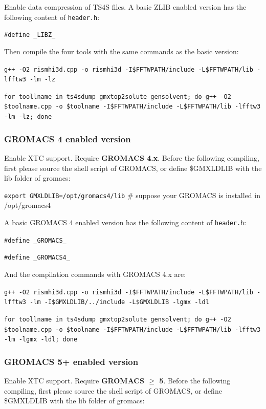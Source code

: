 \documentclass[aip,amsmath,amssymb,reprint,onecolumn]{revtex4-1}
\begin{document}
Enable data compression of TS4S files. A basic ZLIB enabled version has the following content of \texttt{header.h}:

\texttt{\small\color{navyblue}\#define \_LIBZ\_}

Then compile the four tools with the same commands as the basic version:

\texttt{\small\color{blue}g++ -O2 rismhi3d.cpp -o rismhi3d -I\$FFTWPATH/include -L\$FFTWPATH/lib -lfftw3 -lm -lz}

\texttt{\small\color{blue}for toollname in ts4sdump gmxtop2solute gensolvent; do g++ -O2 \$toolname.cpp -o \$toolname -I\$FFTWPATH/include -L\$FFTWPATH/lib -lfftw3 -lm -lz; done}

\subsubsection{GROMACS 4 enabled version}

Enable XTC support. Require {\bf GROMACS 4.x}. Before the following compiling, first please source the shell script of GROMACS, or define \$GMXLDLIB with the lib folder of gromacs:

\texttt{\small\color{blue}export GMXLDLIB=/opt/gromacs4/lib} {\color{lightgray} \# suppose your GROMACS is installed in /opt/gromacs4}

A basic GROMACS 4 enabled version has the following content of \texttt{header.h}:

\texttt{\small\color{navyblue}\#define \_GROMACS\_}

\texttt{\small\color{navyblue}\#define \_GROMACS4\_}

And the compilation commands with GROMACS 4.x are:

\texttt{\small\color{blue}g++ -O2 rismhi3d.cpp -o rismhi3d -I\$FFTWPATH/include -L\$FFTWPATH/lib -lfftw3 -lm -I\$GMXLDLIB/../include -L\$GMXLDLIB -lgmx -ldl}

\texttt{\small\color{blue}for toollname in ts4sdump gmxtop2solute gensolvent; do g++ -O2 \$toolname.cpp -o \$toolname -I\$FFTWPATH/include -L\$FFTWPATH/lib -lfftw3 -lm -lgmx -ldl; done}

\subsubsection{GROMACS 5+ enabled version}

Enable XTC support. Require {\bf GROMACS $\ge$ 5}. Before the following compiling, first please source the shell script of GROMACS, or define \$GMXLDLIB with the lib folder of gromacs:
\end{document}
